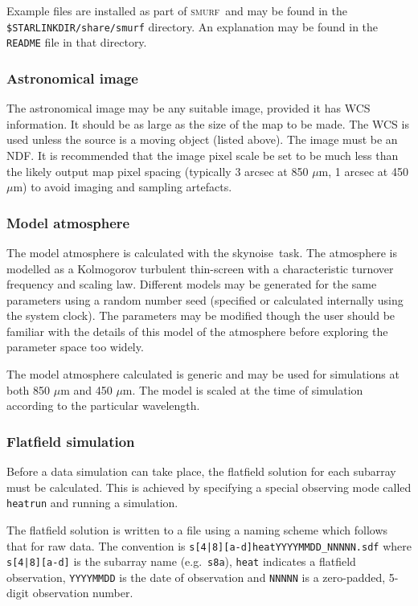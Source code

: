 \documentclass[twoside,11pt]{article}
\newcommand{\xref}[3]{#1}
\renewcommand{\_}{\texttt{\symbol{95}}}
\newcommand{\SMURF}{\textsc{smurf}}
\newcommand{\task}[1]{\textsf{#1}}
\newcommand{\skynoise}{\xref{\task{skynoise}}{sun258}{SKYNOISE}}
\begin{document}
Example files are installed as part of \SMURF\ and may be found in the
\texttt{\$STARLINK\_DIR/share/smurf} directory. An explanation may be
found in the \texttt{README} file in that directory.

\subsubsection{Astronomical image}

The astronomical image may be any suitable image, provided it has WCS
information. It should be as large as the size of the map to be
made. The WCS is used unless the source is a moving object (listed
above). The image must be an NDF. It is recommended that the image
pixel scale be set to be much less than the likely output map pixel
spacing (typically 3 arcsec at 850 $\mu$m, 1 arcsec at 450 $\mu$m) to
avoid imaging and sampling artefacts.

\subsubsection{Model atmosphere}

The model atmosphere is calculated with the \skynoise\ task. The
atmosphere is modelled as a Kolmogorov turbulent thin-screen
\cite{sc2ana002} with a characteristic turnover frequency and scaling
law. Different models may be generated for the same parameters using a
random number seed (specified or calculated internally using the
system clock). The parameters may be modified though the user should
be familiar with the details of this model of the atmosphere before
exploring the parameter space too widely.

The model atmosphere calculated is generic and may be used for
simulations at both 850 $\mu$m and 450 $\mu$m. The model is scaled
at the time of simulation according to the particular wavelength.

\subsubsection{Flatfield simulation}

Before a data simulation can take place, the flatfield solution for
each subarray must be calculated. This is achieved by specifying a
special observing mode called \texttt{heatrun} and running a
simulation.

The flatfield solution is written to a file using a naming scheme
which follows that for raw data. The convention is
\verb+s[4|8][a-d]heatYYYYMMDD_NNNNN.sdf+ where \verb+s[4|8][a-d]+ is
the subarray name (e.g.\ \verb+s8a+), \verb+heat+ indicates a
flatfield observation, \verb+YYYYMMDD+ is the date of observation and
\verb+NNNNN+ is a zero-padded, 5-digit observation number.
\end{document}
